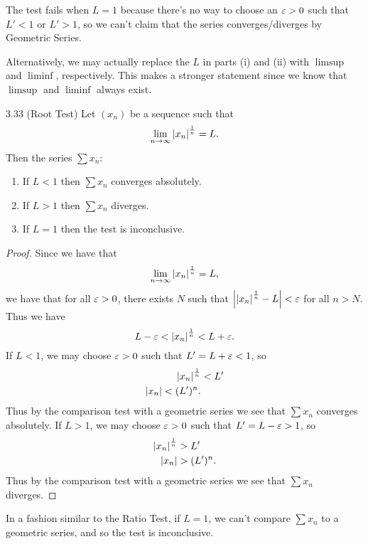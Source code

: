 \documentclass[class=article, crop=false]{standalone}
\begin{document}
  \begin{note}{}
    The test fails when $L = 1$ because there's no way to choose an $\varepsilon > 0$ such that $L' < 1$ or $L' > 1$, so we can't claim that the series converges/diverges by Geometric Series.
  \end{note}
  \begin{note}{}
    Alternatively, we may actually replace the $L$ in parts (i) and (ii) with $\limsup$ and $\liminf$, respectively. This makes a stronger statement since we know that $\limsup$ and $\liminf$ always exist.
  \end{note}
  \begin{theorem}{3.33 (Root Test)}
    Let $(x_n)$ be a sequence such that
    \[
      \lim_{n\to \infty} \left\lvert x_n \right\rvert^{\frac{1}{n}} = L.
    \]
    Then the series $\sum x_n$:
    \begin{enumerate}[label=(\roman*)]
      \item If $L < 1$ then $\sum x_n$ converges absolutely.
      \item If $L > 1$ then $\sum x_n$ diverges.
      \item If $L = 1$ then the test is inconclusive.
    \end{enumerate}
    \begin{proof}
      Since we have that
      \[
        \lim_{n\to \infty} \left\lvert x_n \right\rvert^{\frac{1}{n}} = L,
      \]
      we have that for all $\varepsilon > 0$, there exists $N$ such that $\left\lvert \left\lvert x_n \right\rvert^{\frac{1}{n}} - L \right\rvert < \varepsilon$ for all $n > N$. Thus we have
      \[
        L - \varepsilon < \left\lvert x_n \right\rvert^{\frac{1}{n}} < L + \varepsilon.
      \]
      If $L < 1$, we may choose $\varepsilon > 0$ such that $L' = L + \varepsilon < 1$, so
      \begin{align*}
        \left\lvert x_n \right\rvert^{\frac{1}{n}} &< L' \\
        \left\lvert x_n \right\rvert < (L')^n.
      \end{align*}
      Thus by the comparison test with a geometric series we see that $\sum x_n$ converges absolutely. If $L > 1$, we may choose $\varepsilon > 0$ such that $L' = L - \varepsilon > 1$, so
      \begin{align*}
        \left\lvert x_n \right\rvert^{\frac{1}{n}} &> L' \\
        \left\lvert x_n \right\rvert &> (L')^n.
      \end{align*}
      Thus by the comparison test with a geometric series we see that $\sum x_n$ diverges.
    \end{proof}
  \end{theorem}
  \begin{note}{}
    In a fashion similar to the Ratio Test, if $L = 1$, we can't compare $\sum x_n$ to a geometric series, and so the test is inconclusive.
  \end{note}
\end{document}

